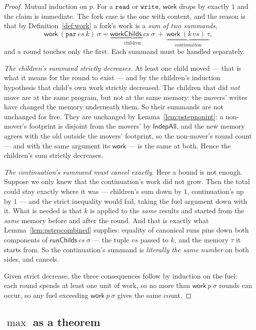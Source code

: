 \documentclass[11pt,a4paper]{article}
\theoremstyle{definition}
\theoremstyle{plain}
\theoremstyle{remark}
\newcommand{\st}{\sigma}
\newcommand{\work}{\mathsf{work}}
\begin{document}
\begin{proof}
Mutual induction on $p$. For a $\texttt{read}$ or $\texttt{write}$, $\work$ drops by exactly
$1$ and the claim is immediate. The fork case is the one with content, and the reason is that
by Definition~\ref{def:work} a fork's work is a \emph{sum of two summands},
\[
  \work\ (\texttt{par}\ cs\ k)\ \st = \underbrace{\mathsf{workChilds}\ cs\ \st}_{\text{children}}
  \ +\ \underbrace{\work\ (k\,vs)\ \tau}_{\text{continuation}},
\]
and a round touches only the first. Each summand must be handled separately.

\emph{The children's summand strictly decreases.} At least one child moved --- that is what it
means for the round to exist --- and by the children's induction hypothesis that child's own
work strictly decreased. The children that did \emph{not} move are at the same program, but
not at the same memory: the movers' writes have changed the memory underneath them. So their
summands are not unchanged for free. They are unchanged by
Lemma~\ref{lem:pstepnonint}: a non-mover's footprint is disjoint from the movers' by
$\mathsf{IndepAll}$, and the new memory agrees with the old outside the movers' footprint, so
the non-mover's round count --- and with the same argument its $\work$ --- is the same at both.
Hence the children's sum strictly decreases.

\emph{The continuation's summand must cancel \emph{exactly}.} Here a bound is not enough.
Suppose we only knew that the continuation's work did not grow. Then the total could stay
exactly where it was --- children's sum down by $1$, continuation's up by $1$ --- and the
strict inequality would fail, taking the fuel argument down with it. What is needed is that
$k$ is applied to the \emph{same} results and started from the \emph{same} memory before and
after the round. And that is exactly what Lemma~\ref{lem:pstepcombined} supplies: equality of
canonical runs pins down both components of $\mathsf{runChilds}\ cs\ \st$ --- the tuple $vs$
passed to $k$, and the memory $\tau$ it starts from. So the continuation's summand is
\emph{literally the same number} on both sides, and cancels.

Given strict decrease, the three consequences follow by induction on the fuel: each round
spends at least one unit of work, so no more than $\work\ p\ \st$ rounds can occur, so any
fuel exceeding $\work\ p\ \st$ gives the same count.
\end{proof}

\subsection{\texorpdfstring{$\max$}{max} as a theorem}\label{sec:cost:max}
\end{document}
